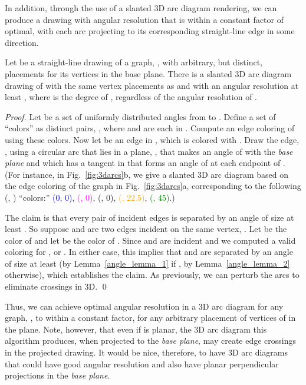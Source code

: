 In addition, through the use of a slanted 3D arc diagram rendering, we
can produce a drawing with angular resolution that is within a constant
factor of optimal, with each arc projecting to its corresponding 
straight-line edge in some direction.

\begin{theorem}
\label{stationary_vertices_thm_2}
Let  be a straight-line drawing of a graph, , 
with arbitrary, but distinct,
placements for its vertices in the base plane. There is a slanted 3D arc
diagram drawing of  with the same vertex placements as  and
with an angular resolution at least , where  is the
degree of , regardless of the angular resolution of .
\end{theorem}

\begin{proof}
Let  be a set of  uniformly distributed
angles from  to . Define a set of  ``colors'' as distinct
pairs, , where  and  are each in .
Compute an edge coloring of  using these colors. Now let  be an edge
in , which is colored with . Draw the edge, , using
a circular arc that lies in a plane, , that makes an angle of
 with the \emph{base plane} and
which has a tangent in  that forms an angle of  at each
endpoint of .
(For instance, in Fig.~\ref{fig:3darcs}b,
we give a slanted 3D arc diagram based on the edge coloring of the graph
in Fig.~\ref{fig:3darcs}a, corresponding to the following 
    (, ) ``colors:''
    \textcolor{blue}{(0, 0)},
    \textcolor{magenta}{(, 0)},
    \textcolor{Sepia}{(, 0)},
    \textcolor{orange}{(, 22.5)},
    \textcolor{green}{(, 45)}.)

The claim is that every pair of incident edges is separated by an
angle of size at least . So suppose  and  are
two edges incident on the same vertex, .  Let 
be the color of  and let  be the color of .
Since  and  are incident and we computed a valid coloring for
,  or . In either
case, this implies that  and  are separated by an angle of size
at least  (by Lemma~\ref{angle_lemma_1} if
, by Lemma~\ref{angle_lemma_2} otherwise),
which establishes the claim.
As previously, we can perturb the arcs to eliminate crossings in 3D.
\qed
\end{proof}

Thus, we can achieve optimal angular resolution in a 3D arc diagram
for any graph, , to within a constant factor, for any arbitrary
placement of vertices of  in the plane. Note, however, that even if
 is planar, the 3D arc diagram this algorithm produces,
when projected to the \emph{base plane}, may create edge crossings in the
projected drawing.  It would be nice, therefore, to have 3D arc
diagrams that could have good angular resolution and also have planar
perpendicular projections in the \emph{base plane}.

